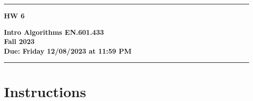 \documentclass[letter,11pt]{article}
\begin{document}
\noindent\rule[2mm]{\textwidth}{1.5mm}
\noindent
\begin{minipage}{.3\textwidth}
  \vspace{-3mm}
  {\Huge\bf HW 6}
\end{minipage}\hfill\begin{minipage}{.5\textwidth}
\begin{flushright}
  {\bf Intro Algorithms EN.601.433 \\
  Fall 2023 \\
  Due: Friday 12/08/2023 at 11:59 PM}%
\vspace{3mm}
\end{flushright}
\end{minipage}
\noindent\rule{\textwidth}{1.5mm}

\section*{Instructions}
\end{document}
